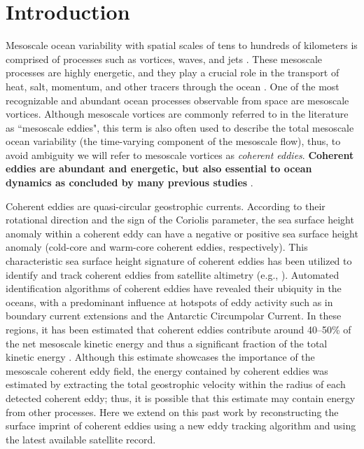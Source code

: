 \documentclass[draft,linenumbers]{agujournal2019}
\begin{document}
\section{Introduction}

Mesoscale ocean variability with spatial scales of tens to hundreds of kilometers is comprised of processes such as vortices, waves, and jets \citep{Ferrari_energy_2009, Fu_Eddy_2010}. 
These mesoscale processes are highly energetic, and they play a crucial role in the transport of heat, salt, momentum, and other tracers through the ocean \citep{Wunsch_energetics_2004, Wyrtki_Eddy_1976, Gill_Energy_1974}. One of the most recognizable and abundant ocean processes observable from space are mesoscale vortices. Although mesoscale vortices are commonly referred to in the literature as ``mesoscale eddies", this term is also often used to describe the total mesoscale ocean variability (the time-varying component of the mesoscale flow), thus, to avoid ambiguity we will refer to mesoscale vortices as \emph{coherent eddies}. \textbf{Coherent eddies are abundant and energetic, but also essential to ocean dynamics as concluded by many previous studies} \citep{Hogg_Interdecadal_2006,Siegel_Bio_2011,BeronVera_Agulhas_2013,Frenger_Imprint_2013,Frenger_Southern_2015,Pilo_eddy_2015,Schubert_submesoscale_2019,Patel_SO_eddies_2020}.


Coherent eddies are quasi-circular geostrophic currents. According to their rotational direction and the sign of the Coriolis parameter, the sea surface height anomaly within a coherent eddy can have a negative or positive sea surface height anomaly (cold-core and warm-core coherent eddies, respectively). 
This characteristic sea surface height signature of coherent eddies has been utilized to identify and track coherent eddies from satellite altimetry (e.g., \citealp{Chelton_Global_2007, Faghmous_A_2015, Ashkezari_eddies_2016,Martinez_TKE_2019, Cui_eddy_identification_2020}). 
Automated identification algorithms of coherent eddies have revealed their ubiquity in the oceans, with a predominant influence at hotspots of eddy activity such as in boundary current extensions and the Antarctic Circumpolar Current. In these regions, it has been estimated that coherent eddies contribute around 40--50\% of the net mesoscale kinetic energy \citep{Chelton_The_2011} and thus a significant fraction of the total kinetic energy \citep{Ferrari_energy_2009}. 
Although this estimate showcases the importance of the mesoscale coherent eddy field, the energy contained by coherent eddies was estimated by extracting the total geostrophic velocity within the radius of each detected coherent eddy; thus, it is possible that this estimate may contain energy from other processes. 
Here we extend on this past work by reconstructing the surface imprint of coherent eddies using a new eddy tracking algorithm and using the latest  available satellite record.
\end{document}
